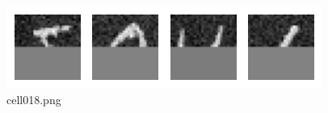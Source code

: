 \begin{figure}[ht]
	\centering
	\includegraphics[scale=0.8, max width=\linewidth]{./fig/energy-based-model/boltzmann-machine/cell018.png}
	\caption{cell018.png}
	\label{cell018.png}
\end{figure}